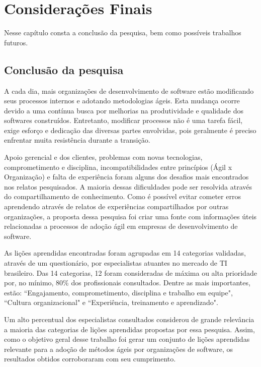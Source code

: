 \chapter{Considerações Finais}

Nesse capítulo consta a conclusão da pesquisa, bem como possíveis trabalhos futuros.

\section{Conclusão da pesquisa}

A cada dia, mais organizações de desenvolvimento de software estão modificando seus processos internos e adotando metodologias ágeis. Esta mudança ocorre devido a uma contínua busca por melhorias na produtividade e qualidade dos softwares construídos. Entretanto, modificar processos não é uma tarefa fácil, exige esforço e dedicação das diversas partes envolvidas, pois geralmente é preciso enfrentar muita resistência durante a transição.

Apoio gerencial e dos clientes, problemas com novas tecnologias, comprometimento e disciplina, incompatibilidades entre princípios (Ágil x Organização) e falta de experiência foram alguns dos desafios mais encontrados nos relatos pesquisados. A maioria dessas dificuldades pode ser resolvida através do compartilhamento de conhecimento. Como é possível evitar cometer erros aprendendo através de relatos de experiências compartilhados por outras organizações, a proposta dessa pesquisa foi criar uma fonte com informações úteis relacionadas a processos de adoção ágil em empresas de desenvolvimento de software.

As lições aprendidas encontradas foram agrupadas em 14 categorias validadas, através de um questionário, por especialistas atuantes no mercado de TI brasileiro. Das 14 categorias, 12 foram consideradas de máxima ou alta prioridade por, no mínimo, 80\% dos profissionais consultados. Dentre as mais importantes, estão: ``Engajamento, comprometimento, disciplina e trabalho em equipe", ``Cultura organizacional" e ``Experiência, treinamento e aprendizado".

Um alto percentual dos especialistas consultados considerou de grande relevância a maioria das categorias de lições aprendidas propostas por essa pesquisa. Assim, como o objetivo geral desse trabalho foi gerar um conjunto de lições aprendidas relevante para a adoção de métodos ágeis por organizações de software, os resultados obtidos corroboraram com seu cumprimento.


